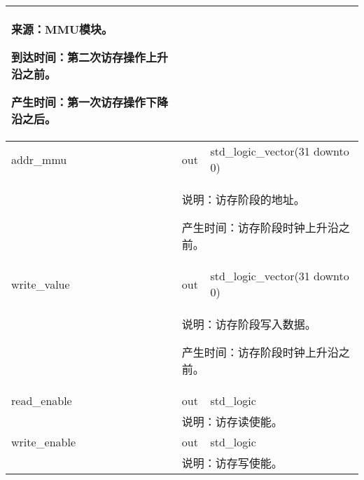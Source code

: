 \begin{tabularx}{\textwidth}{lll}
{                来源：MMU模块。

                到达时间：第二次访存操作上升沿之前。

                产生时间：第一次访存操作下降沿之后。
            } \\
            \midrule
            addr\_mmu    & out  & std\_logic\_vector(31 downto 0) \\
            \cmidrule(l){2-3}
            &
            \multicolumn{2}{X}{
                说明：访存阶段的地址。

                产生时间：访存阶段时钟上升沿之前。
            } \\
            \midrule
            write\_value & out & std\_logic\_vector(31 downto 0) \\
            \cmidrule(l){2-3}
            &
            \multicolumn{2}{X}{
                说明：访存阶段写入数据。

                产生时间：访存阶段时钟上升沿之前。
            } \\
            \midrule
            read\_enable & out & std\_logic \\
            \cmidrule(l){2-3}
            &
            \multicolumn{2}{X}{
                说明：访存读使能。
            } \\
            \midrule
            write\_enable & out & std\_logic \\
            \cmidrule(l){2-3}
            &
            \multicolumn{2}{X}{
                说明：访存写使能。
            } \\
            \bottomrule
        \end{tabularx}
